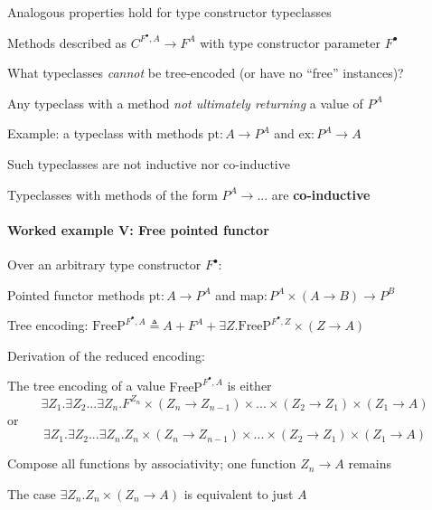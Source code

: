 Analogous properties hold for type constructor typeclasses

Methods described as $C^{F^{\bullet},A}\rightarrow F^{A}$ with type
constructor parameter $F^{\bullet}$

What typeclasses \emph{cannot} be tree-encoded (or have no \textsf{``}free\textsf{''}
instances)?

Any typeclass with a method \emph{not ultimately returning} a value
of $P^{A}$

Example: a typeclass with methods $\text{pt}:A\rightarrow P^{A}$
and $\text{ex}:P^{A}\rightarrow A$

Such typeclasses are not inductive nor co-inductive

Typeclasses with methods of the form $P^{A}\rightarrow...$ are \textbf{co-inductive}


\paragraph{Worked example V: Free pointed functor}

Over an arbitrary type constructor $F^{\bullet}$:

Pointed functor methods {\footnotesize{}$\text{pt}:A\rightarrow P^{A}$}
and {\footnotesize{}$\text{map}:P^{A}\times\left(A\rightarrow B\right)\rightarrow P^{B}$}{\footnotesize\par}

Tree encoding: {\footnotesize{}$\text{FreeP}^{F^{\bullet},A}\triangleq A+F^{A}+\exists Z.\text{FreeP}^{F^{\bullet},Z}\times\left(Z\rightarrow A\right)$}{\footnotesize\par}

Derivation of the reduced encoding:

The tree encoding of a value $\text{FreeP}^{F^{\bullet},A}$ is either{\footnotesize{}
\[
\exists Z_{1}.\exists Z_{2}...\exists Z_{n}.F^{Z_{n}}\times\left(Z_{n}\rightarrow Z_{n-1}\right)\times...\times\left(Z_{2}\rightarrow Z_{1}\right)\times\left(Z_{1}\rightarrow A\right)
\]
}or{\footnotesize{}
\[
\exists Z_{1}.\exists Z_{2}...\exists Z_{n}.Z_{n}\times\left(Z_{n}\rightarrow Z_{n-1}\right)\times...\times\left(Z_{2}\rightarrow Z_{1}\right)\times\left(Z_{1}\rightarrow A\right)
\]
}{\footnotesize\par}

Compose all functions by associativity; one function $Z_{n}\rightarrow A$
remains

The case $\exists Z_{n}.Z_{n}\times\left(Z_{n}\rightarrow A\right)$
is equivalent to just $A$


